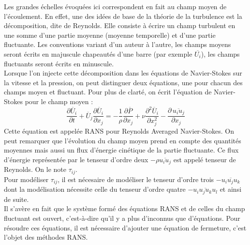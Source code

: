 \documentclass[a4paper,12pt]{article}
\newcommand{\cad}{c'est-à-dire}
\newcommand{\NS}{Navier-Stokes}
\numberwithin{equation}{section} %
\begin{document}
\noindent Les grandes échelles évoquées ici correspondent en fait au champ moyen de l'écoulement. En effet, une des idées de base de la théorie de la turbulence est la décomposition, dite de Reynolds. Elle consiste à écrire un champ turbulent en une somme d'une partie moyenne (moyenne temporelle) et d'une partie fluctuante. Les conventions variant d'un auteur à l'autre, les champs moyens seront écrits en majuscule chapeautés d'une barre (par exemple $\overline{U_i}$), les champs fluctuants seront écrits en minuscule. \\
Lorsque l'on injecte cette décomposition dans les équations de \NS $ $ sur la vitesse et la pression, on peut distinguer deux équations, une pour chacun des champs moyen et fluctuant. Pour plus de clarté, on écrit l'équation de \NS $ $ pour le champ moyen : 
\begin{equation}
 \frac{\partial \overline{U}_i}{\partial t} + \overline{U}_j \frac{\partial \overline{U}_i}{\partial x_j} = -\frac{1}{\rho} \frac{\partial \overline{P}}{\partial x_j} + \nu \frac{\partial^2 \overline{U}_i}{\partial x_j^2}  - \frac{\partial \, \overline{u_iu_j}}{\partial x_j} \label{meanfield}
 \end{equation}
  Cette équation est appelée RANS pour Reynolds Averaged \NS. On peut remarquer que l'évolution du champ moyen prend en compte des quantités moyennes mais aussi un flux d'énergie cinétique de la partie fluctuante. Ce flux d'énergie représentée par le tenseur d'ordre deux $-\rho \overline{u_iu_j}$ est appelé tenseur de Reynolds. On le note $\tau_{ij}$.\\
Pour modéliser $\tau_{ij}$, il est nécesaire de modéliser le tenseur d'ordre trois $-\overline{u_iu_ju_k}$ dont la modélisation nécessite celle du tenseur d'ordre quatre $-\overline{u_iu_ju_ku_l}$ et ainsi de suite. \\
  Il s'avère en fait que le système formé des équations RANS et de celles du champ fluctuant est ouvert, \cad $ $ qu'il y a plus d'inconnus que d'équations. Pour résoudre ces équations, il est nécessaire d'ajouter une équation de fermeture, c'est l'objet des méthodes RANS.\\ %
  
\end{document}
